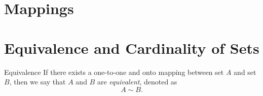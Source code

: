 \section{Mappings}



\section{Equivalence and Cardinality of Sets}

\begin{definition}{Equivalence}{}
  If there exists a one-to-one and onto mapping between set $A$ and set $B$,
  then we say that $A$ and $B$ are \emph{equivalent}, denoted as
  \begin{equation}
    A \sim B.
  \end{equation}
\end{definition}






